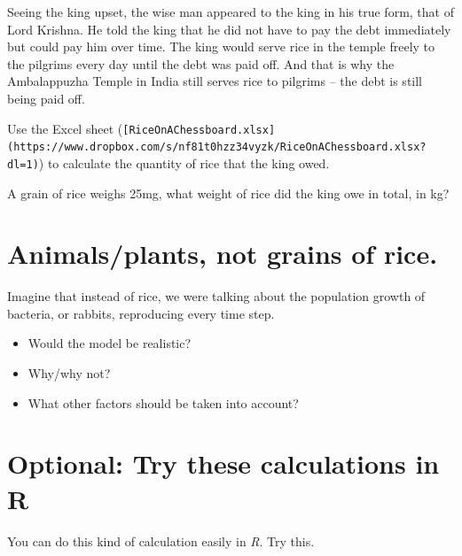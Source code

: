 \documentclass[
  a4paper]{book}
\newenvironment{Shaded}{\begin{snugshade}}{\end{snugshade}}
\newcommand{\AttributeTok}[1]{\textcolor[rgb]{0.13,0.29,0.53}{#1}}
\newcommand{\ConstantTok}[1]{\textcolor[rgb]{0.56,0.35,0.01}{#1}}
\newcommand{\ControlFlowTok}[1]{\textcolor[rgb]{0.13,0.29,0.53}{\textbf{#1}}}
\newcommand{\DecValTok}[1]{\textcolor[rgb]{0.00,0.00,0.81}{#1}}
\newcommand{\FunctionTok}[1]{\textcolor[rgb]{0.13,0.29,0.53}{\textbf{#1}}}
\newcommand{\NormalTok}[1]{#1}
\newcommand{\OtherTok}[1]{\textcolor[rgb]{0.56,0.35,0.01}{#1}}
\newcommand{\SpecialCharTok}[1]{\textcolor[rgb]{0.81,0.36,0.00}{\textbf{#1}}}
\providecommand{\tightlist}{%
  \setlength{\itemsep}{0pt}\setlength{\parskip}{0pt}}
\begin{document}
Seeing the king upset, the wise man appeared to the king in his true form, that of Lord Krishna. He told the king that he did not have to pay the debt immediately but could pay him over time. The king would serve rice in the temple freely to the pilgrims every day until the debt was paid off. And that is why the Ambalappuzha Temple in India still serves rice to pilgrims -- the debt is still being paid off.

Use the Excel sheet (\texttt{{[}RiceOnAChessboard.xlsx{]}(https://www.dropbox.com/s/nf81t0hzz34vyzk/RiceOnAChessboard.xlsx?dl=1)}) to calculate the quantity of rice that the king owed.

A grain of rice weighs 25mg, what weight of rice did the king owe in total, in kg?

\section{Animals/plants, not grains of rice.}\label{animalsplants-not-grains-of-rice.}

Imagine that instead of rice, we were talking about the population growth of bacteria, or rabbits, reproducing every time step.

\begin{itemize}
\tightlist
\item
  Would the model be realistic?
\item
  Why/why not?
\item
  What other factors should be taken into account?
\end{itemize}

\section{Optional: Try these calculations in R}\label{optional-try-these-calculations-in-r}

You can do this kind of calculation easily in \emph{R}. Try this.

\begin{Shaded}
\end{Shaded}
\end{document}
